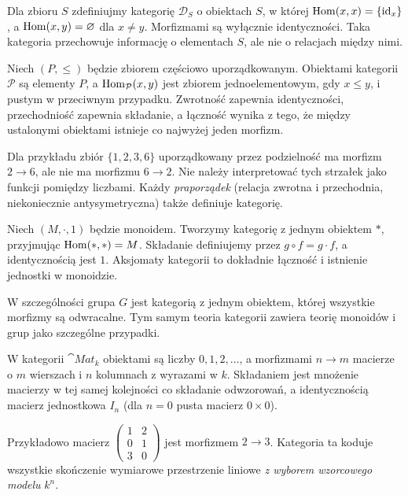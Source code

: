 \begin{przyklad}
Dla zbioru $S$ zdefiniujmy kategorię $\mathcal D_S$ o obiektach $S$, w której $\operatorname{Hom}(x,x)=\{\mathrm{id}_x\}$, a $\operatorname{Hom}(x,y)=\varnothing$ dla $x\neq y$. Morfizmami są wyłącznie identyczności. Taka kategoria przechowuje informację o elementach $S$, ale nie o relacjach między nimi.
\end{przyklad}

\begin{przyklad}\label{przyklad:poset}
Niech $(P,\leq)$ będzie zbiorem częściowo uporządkowanym. Obiektami kategorii $\mathcal P$ są elementy $P$, a $\operatorname{Hom}_{\mathcal P}(x,y)$ jest zbiorem jednoelementowym, gdy $x\leq y$, i pustym w przeciwnym przypadku. Zwrotność zapewnia identyczności, przechodniość zapewnia składanie, a łączność wynika z tego, że między ustalonymi obiektami istnieje co najwyżej jeden morfizm.

Dla przykładu zbiór $\{1,2,3,6\}$ uporządkowany przez podzielność ma morfizm $2\to 6$, ale nie ma morfizmu $6\to 2$. Nie należy interpretować tych strzałek jako funkcji pomiędzy liczbami. Każdy \emph{praporządek} (relacja zwrotna i przechodnia, niekoniecznie antysymetryczna) także definiuje kategorię.
\end{przyklad}

\begin{przyklad}\label{przyklad:monoid-kat}
Niech $(M,\cdot,1)$ będzie monoidem. Tworzymy kategorię z jednym obiektem $*$, przyjmując $\operatorname{Hom}(*,*)=M$. Składanie definiujemy przez $g\circ f=g\cdot f$, a identycznością jest $1$. Aksjomaty kategorii to dokładnie łączność i istnienie jednostki w monoidzie.

W szczególności grupa $G$ jest kategorią z jednym obiektem, której wszystkie morfizmy są odwracalne. Tym samym teoria kategorii zawiera teorię monoidów i grup jako szczególne przypadki.
\end{przyklad}

\begin{przyklad}\label{przyklad:mat}
W kategorii $\cat{Mat}_k$ obiektami są liczby $0,1,2,\ldots$, a morfizmami $n\to m$ macierze o $m$ wierszach i $n$ kolumnach z wyrazami w $k$. Składaniem jest mnożenie macierzy w tej samej kolejności co składanie odwzorowań, a identycznością macierz jednostkowa $I_n$ (dla $n=0$ pusta macierz $0\times0$).

Przykładowo macierz $\begin{pmatrix}1&2\\0&1\\3&0\end{pmatrix}$ jest morfizmem $2\to3$. Kategoria ta koduje wszystkie skończenie wymiarowe przestrzenie liniowe \emph{z wyborem wzorcowego modelu} $k^n$.
\end{przyklad}

